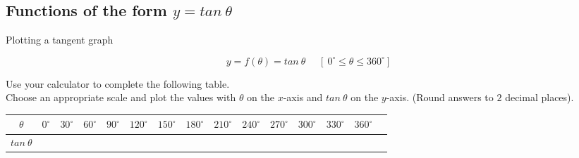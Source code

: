 \subsection*{Functions of the form $y=tan ~\theta$}
\begin{wex}
{Plotting a tangent graph}
{
\begin{equation*}
 y=f(\theta)=tan ~\theta~~~~~~[~0^{\circ} \leq \theta \leq 360^{\circ}]
\end{equation*}

Use your calculator to complete the following table. \\
Choose an appropriate scale and plot the values with $\theta $ on the $x$-axis and $tan ~\theta$ on the $y$-axis. (Round answers to $2$ decimal places). 

\begin{table}[H]
\begin{tabular}{|c|m{0.3cm}|m{0.4cm}|m{0.4cm}|m{0.4cm}|m{0.5cm}|m{0.5cm}|m{0.5cm}|m{0.5cm}|m{0.5cm}|m{0.5cm}|m{0.5cm}|m{0.5cm}|m{0.5cm}|} \hline

\footnotesize$\theta $&
\footnotesize$0^{\circ }$&
\footnotesize$30^{\circ }$&
\footnotesize$60^{\circ }$&
\footnotesize$90^{\circ }$&
\footnotesize$120^{\circ }$&
\footnotesize$150^{\circ }$&
\footnotesize$180^{\circ }$&
\footnotesize$210^{\circ }$&
\footnotesize$240^{\circ }$&
\footnotesize$270^{\circ }$&
\footnotesize$300^{\circ }$&
\footnotesize$330^{\circ }$&
\footnotesize$360^{\circ }$
\\ \hline

\footnotesize$tan ~\theta $&
&
&
&
&
&
&
&
&
&
&
&
&
&

 \hline
\end{tabular}


\end{table}}
\end{wex}
